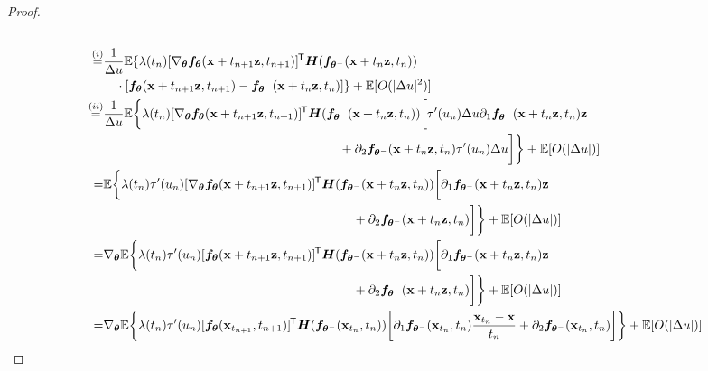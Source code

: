\begin{appendices}
\begin{proof}
\begin{align}
\begin{multlined}[t][0.9\displaywidth]
        \end{multlined}\notag \\
        \stackrel{(i)}{=}&\begin{multlined}[t][0.9\displaywidth]
            \frac{1}{\Delta u} \mbb{E}\{\lambda(t_n)[\nabla_\vtheta \vf_\vtheta(\rvx + t_{n+1}\rvz, t_{n+1})]\tran \mH(\vf_{\vtheta^{-}}(\rvx + t_n \rvz, t_n))\\ \cdot [\vf_\vtheta(\rvx + t_{n+1}\rvz, t_{n+1}) - \vf_{\vtheta^-}(\rvx + t_n \rvz, t_n)]\} + \mbb{E}[O(|\Delta u|^2)]
        \end{multlined}\label{eq:continue} \\
        \stackrel{(ii)}{=}&\begin{multlined}[t][0.9\displaywidth]
                \frac{1}{\Delta u}\mbb{E}\bigg\{\lambda(t_n)[\nabla_\vtheta \vf_\vtheta(\rvx + t_{n+1}\rvz, t_{n+1})]\tran \mH(\vf_{\vtheta^{-}}(\rvx + t_n \rvz, t_n))\bigg[\tau'(u_n)\Delta u \partial_1 \vf_{\vtheta^{-}}(\rvx + t_n \rvz, t_n)\rvz \\ + \partial_2 \vf_{\vtheta^{-}}(\rvx + t_n \rvz, t_n)\tau'(u_n)\Delta u \bigg]\bigg\} + \mbb{E}[O(|\Delta u|)]
            \end{multlined}\notag \\
        =&\begin{multlined}[t][0.9\displaywidth]
            \mbb{E}\bigg\{\lambda(t_n)\tau'(u_n)[\nabla_\vtheta \vf_\vtheta(\rvx + t_{n+1}\rvz, t_{n+1})]\tran \mH(\vf_{\vtheta^{-}}(\rvx + t_n \rvz, t_n))\bigg[\partial_1 \vf_{\vtheta^{-}}(\rvx + t_n \rvz, t_n)\rvz \\ + \partial_2 \vf_{\vtheta^{-}}(\rvx + t_n \rvz, t_n)\bigg]\bigg\} + \mbb{E}[O(|\Delta u|)]
        \end{multlined}\notag \\
        =&\begin{multlined}[t][0.9\displaywidth]
            \nabla_\vtheta \mbb{E}\bigg\{\lambda(t_n)\tau'(u_n)[\vf_\vtheta(\rvx + t_{n+1}\rvz, t_{n+1})]\tran \mH(\vf_{\vtheta^{-}}(\rvx + t_n \rvz, t_n))\bigg[\partial_1 \vf_{\vtheta^{-}}(\rvx + t_n \rvz, t_n)\rvz \\ + \partial_2 \vf_{\vtheta^{-}}(\rvx + t_n \rvz, t_n)\bigg]\bigg\} + \mbb{E}[O(|\Delta u|)]
        \end{multlined}\notag \\
        =&\nabla_\vtheta \mbb{E}\bigg\{\lambda(t_n)\tau'(u_n)[\vf_\vtheta(\rvx_{t_{n+1}}, t_{n+1})]\tran \mH(\vf_{\vtheta^{-}}(\rvx_{t_n}, t_n))\bigg[\partial_1 \vf_{\vtheta^{-}}(\rvx_{t_n}, t_n)\frac{\rvx_{t_n} - \rvx}{t_n} + \partial_2 \vf_{\vtheta^{-}}(\rvx_{t_n}, t_n)\bigg]\bigg\} + \mbb{E}[O(|\Delta u|)]\notag \\

\end{align}
\end{proof}
\end{appendices}

